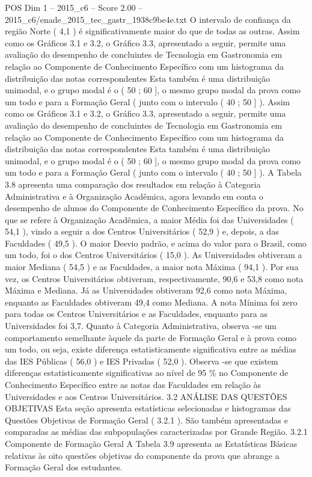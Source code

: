 \begin{textsample}{POS Dim 1 – 2015\_c6 – Score 2.00 – 2015\_c6/enade\_2015\_tec\_gastr\_1938c9be4e.txt}
O intervalo de confiança da região Norte ( 4,1 ) é significativamente maior do que de todas as outras.
Assim como os Gráficos 3.1 e 3.2, o Gráfico 3.3, apresentado a seguir, permite uma avaliação do desempenho de concluintes de Tecnologia em Gastronomia em relação ao Componente de Conhecimento Específico com um histograma da distribuição das notas correspondentes Esta também é uma distribuição unimodal, e o grupo modal é o ( 50 ; 60 ], o mesmo grupo modal da prova como um todo e para a Formação Geral ( junto com o intervalo ( 40 ; 50 ] ).
Assim como os Gráficos 3.1 e 3.2, o Gráfico 3.3, apresentado a seguir, permite uma avaliação do desempenho de concluintes de Tecnologia em Gastronomia em relação ao Componente de Conhecimento Específico com um histograma da distribuição das notas correspondentes Esta também é uma distribuição unimodal, e o grupo modal é o ( 50 ; 60 ], o mesmo grupo modal da prova como um todo e para a Formação Geral ( junto com o intervalo ( 40 ; 50 ] ).
A Tabela 3.8 apresenta uma comparação dos resultados em relação à Categoria Administrativa e à Organização Acadêmica, agora levando em conta o desempenho de alunos do Componente de Conhecimento Específico da prova.
No que se refere à Organização Acadêmica, a maior Média foi das Universidades ( 54,1 ), vindo a seguir a dos Centros Universitários ( 52,9 ) e, depois, a das Faculdades ( 49,5 ).
O maior Desvio padrão, e acima do valor para o Brasil, como um todo, foi o dos Centros Universitários ( 15,0 ).
As Universidades obtiveram a maior Mediana ( 54,5 ) e as Faculdades, a maior nota Máxima ( 94,1 ).
Por sua vez, os Centros Universitários obtiveram, respectivamente, 90,6 e 53,8 como nota Máxima e Mediana.
Já as Universidades obtiveram 92,6 como nota Máxima, enquanto as Faculdades obtiveram 49,4 como Mediana.
A nota Mínima foi zero para todas os Centros Universitários e as Faculdades, enquanto para as Universidades foi 3,7.
Quanto à Categoria Administrativa, observa -se um comportamento semelhante àquele da parte de Formação Geral e à prova como um todo, ou seja, existe diferença estatisticamente significativa entre as médias das IES Públicas ( 56,0 ) e IES Privadas ( 52,0 ).
Observa -se que existem diferenças estatisticamente significativas ao nível de 95 \% no Componente de Conhecimento Específico entre as notas das Faculdades em relação às Universidades e aos Centros Universitários. 3.2 ANÁLISE DAS QUESTÕES OBJETIVAS Esta seção apresenta estatísticas selecionadas e histogramas das Questões Objetivas de Formação Geral ( 3.2.1 ).
São também apresentadas e comparadas as médias das subpopulações caracterizadas por Grande Região. 3.2.1 Componente de Formação Geral A Tabela 3.9 apresenta as Estatísticas Básicas relativas às oito questões objetivas do componente da prova que abrange a Formação Geral dos estudantes.

\end{textsample}
